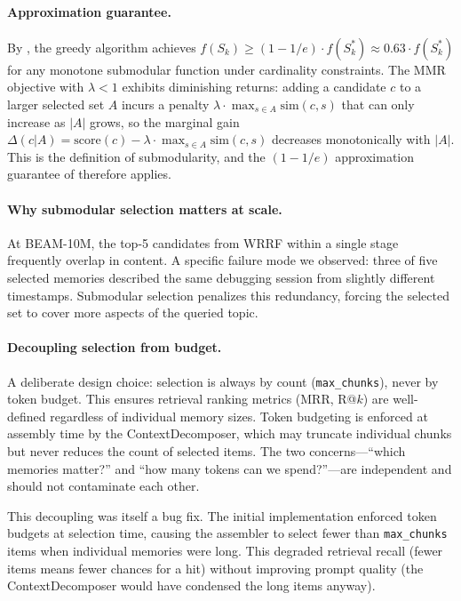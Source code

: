\documentclass[11pt]{article}
\begin{document}
\paragraph{Approximation guarantee.}
By \citet{Krause2008}, the greedy algorithm achieves
$f(S_k) \geq (1 - 1/e) \cdot f(S_k^*) \approx 0.63 \cdot f(S_k^*)$
for any monotone submodular function under cardinality constraints.
The MMR objective with $\lambda < 1$ exhibits diminishing returns:
adding a candidate $c$ to a larger selected set $A$ incurs a
penalty $\lambda \cdot \max_{s \in A} \mathrm{sim}(c, s)$ that
can only increase as $|A|$ grows, so the marginal gain
$\Delta(c|A) = \mathrm{score}(c) - \lambda \cdot \max_{s \in A}
\mathrm{sim}(c, s)$ decreases monotonically with $|A|$.  This
is the definition of submodularity, and the $(1 - 1/e)$
approximation guarantee of \citet{Krause2008} therefore applies.

\paragraph{Why submodular selection matters at scale.}
At BEAM-10M, the top-5 candidates from WRRF within a single stage
frequently overlap in content.  A specific failure mode we observed:
three of five selected memories described the same debugging session
from slightly different timestamps.  Submodular selection penalizes
this redundancy, forcing the selected set to cover more aspects of
the queried topic.

\paragraph{Decoupling selection from budget.}
A deliberate design choice: selection is always by count
(\texttt{max\_chunks}), never by token budget.  This ensures retrieval
ranking metrics (MRR, R@$k$) are well-defined regardless of individual
memory sizes.  Token budgeting is enforced at assembly time by the
ContextDecomposer, which may truncate individual chunks but never
reduces the count of selected items.  The two concerns---``which
memories matter?'' and ``how many tokens can we spend?''---are
independent and should not contaminate each other.

This decoupling was itself a bug fix.  The initial implementation
enforced token budgets at selection time, causing the assembler to
select fewer than \texttt{max\_chunks} items when individual memories
were long.  This degraded retrieval recall (fewer items means fewer
chances for a hit) without improving prompt quality (the
ContextDecomposer would have condensed the long items anyway).
\end{document}
